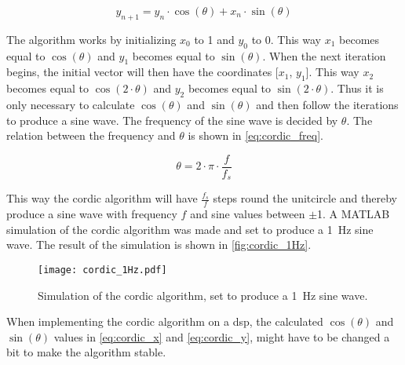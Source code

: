 \begin{equation}
\label{eq:cordic_y}
		y_{n+1} = y_n \cdot \cos(\theta) + x_n \cdot \sin(\theta) 
\end{equation}
\startexplain
\stopexplain

The algorithm works by initializing $x_0$ to 1 and $y_0$ to 0. This way $x_1$ becomes equal to $\cos(\theta)$ and $y_1$ becomes equal to $\sin(\theta)$. When the next iteration begins, the initial vector will then have the coordinates [$x_1$, $y_1$]. This way $x_2$ becomes equal to $\cos(2 \cdot \theta)$ and $y_2$ becomes equal to $\sin(2 \cdot \theta)$. Thus it is only necessary to calculate $\cos(\theta)$ and $\sin(\theta)$ and then follow the iterations to produce a sine wave. The frequency of the sine wave is decided by $\theta$. The relation between the frequency and $\theta$ is shown in \autoref{eq:cordic_freq}.

\begin{equation}
\label{eq:cordic_freq}
		\theta = 2 \cdot \pi \cdot \frac{f}{f_s} 
\end{equation}
\startexplain
\stopexplain 

This way the \gls{cordic} algorithm will have $\frac{f_s}{f}$ steps round the unitcircle and thereby produce a sine wave with frequency $f$ and sine values between $\pm$1.
A MATLAB simulation of the \gls{cordic} algorithm was made and set to produce a \SI{1}{\hertz} sine wave. The result of the simulation is shown in \autoref{fig:cordic_1Hz}.

\begin{figure}[!h]
    \centering
        \texttt{[image: cordic\_1Hz.pdf]}
        \caption{Simulation of the \gls{cordic} algorithm, set to produce a \SI{1}{\hertz} sine wave.}
        \label{fig:cordic_1Hz}
  \end{figure}
  
When implementing the \gls{cordic} algorithm on a \gls{dsp}, the calculated $\cos(\theta)$ and $\sin(\theta)$ values in \autoref{eq:cordic_x} and \autoref{eq:cordic_y}, might have to be changed a bit to make the algorithm stable. 
\newpage
